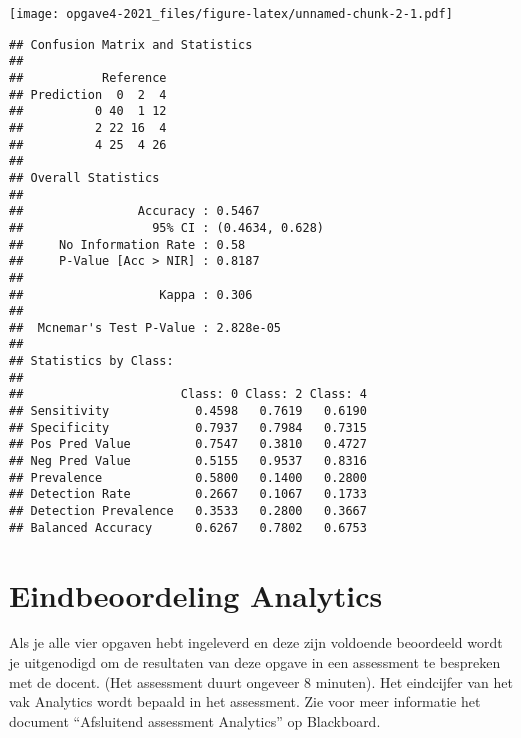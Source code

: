 \documentclass[
]{article}
\newenvironment{Shaded}{\begin{snugshade}}{\end{snugshade}}
\newcommand{\AttributeTok}[1]{\textcolor[rgb]{0.77,0.63,0.00}{#1}}
\newcommand{\CommentTok}[1]{\textcolor[rgb]{0.56,0.35,0.01}{\textit{#1}}}
\newcommand{\FunctionTok}[1]{\textcolor[rgb]{0.00,0.00,0.00}{#1}}
\newcommand{\NormalTok}[1]{#1}
\newcommand{\OtherTok}[1]{\textcolor[rgb]{0.56,0.35,0.01}{#1}}
\newcommand{\SpecialCharTok}[1]{\textcolor[rgb]{0.00,0.00,0.00}{#1}}
\newcommand{\StringTok}[1]{\textcolor[rgb]{0.31,0.60,0.02}{#1}}
\begin{document}
\texttt{[image: opgave4-2021\_files/figure-latex/unnamed-chunk-2-1.pdf]}

\begin{Shaded}
\end{Shaded}

\begin{verbatim}
## Confusion Matrix and Statistics
## 
##           Reference
## Prediction  0  2  4
##          0 40  1 12
##          2 22 16  4
##          4 25  4 26
## 
## Overall Statistics
##                                          
##                Accuracy : 0.5467         
##                  95% CI : (0.4634, 0.628)
##     No Information Rate : 0.58           
##     P-Value [Acc > NIR] : 0.8187         
##                                          
##                   Kappa : 0.306          
##                                          
##  Mcnemar's Test P-Value : 2.828e-05      
## 
## Statistics by Class:
## 
##                      Class: 0 Class: 2 Class: 4
## Sensitivity            0.4598   0.7619   0.6190
## Specificity            0.7937   0.7984   0.7315
## Pos Pred Value         0.7547   0.3810   0.4727
## Neg Pred Value         0.5155   0.9537   0.8316
## Prevalence             0.5800   0.1400   0.2800
## Detection Rate         0.2667   0.1067   0.1733
## Detection Prevalence   0.3533   0.2800   0.3667
## Balanced Accuracy      0.6267   0.7802   0.6753
\end{verbatim}

\hypertarget{eindbeoordeling-analytics}{%
\section{Eindbeoordeling Analytics}\label{eindbeoordeling-analytics}}

Als je alle vier opgaven hebt ingeleverd en deze zijn voldoende
beoordeeld wordt je uitgenodigd om de resultaten van deze opgave in een
assessment te bespreken met de docent. (Het assessment duurt ongeveer 8
minuten). Het eindcijfer van het vak Analytics wordt bepaald in het
assessment. Zie voor meer informatie het document ``Afsluitend
assessment Analytics'' op Blackboard.
\end{document}
